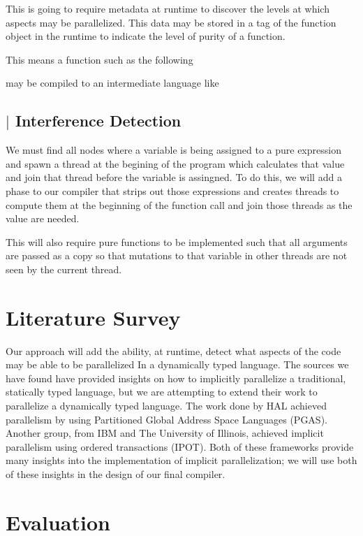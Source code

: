 \documentclass{article}
\begin{document}
\begin{multicols}{2}
This is going to require metadata at runtime to discover the levels at which
aspects may be parallelized. This data may be stored in a tag of the function
object in the runtime to indicate the level of purity of a function.

This means a function such as the following


may be compiled to an intermediate language like


\subsection*{$\vert$ Interference Detection}

We must find all nodes where a variable is being assigned to a pure expression
and spawn a thread at the begining of the program which calculates that value
and join that thread before the variable is assingned. To do this, we will add
a phase to our compiler that strips out those expressions and creates threads to
compute them at the beginning of the function call and join those threads as the value
are needed.

This will also require pure functions to be implemented such that all arguments are
passed as a copy so that mutations to that variable in other threads are not seen
by the current thread.

\section{Literature Survey}

Our approach will add the ability, at runtime, detect what aspects of the code
may be able to be parallelized In a dynamically typed language. The sources we
have found have provided insights on how to implicitly parallelize a
traditional, statically typed language, but we are attempting to extend their
work to parallelize a dynamically typed language. The work done by HAL achieved
parallelism by using Partitioned Global Address Space Languages (PGAS). Another
group, from IBM and The University of Illinois, achieved implicit parallelism
using ordered transactions (IPOT). Both of these frameworks provide many
insights into the implementation of implicit parallelization; we will use both
of these insights in the design of our final compiler.

\section{Evaluation}


\end{multicols}
\end{document}
